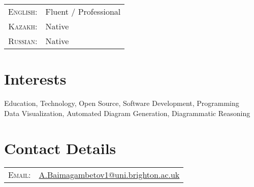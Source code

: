 \documentclass[a4paper,11pt]{article} %
\begin{document}
\begin{tabular}{rl}
\textsc{English:} & Fluent / Professional\\

\textsc{Kazakh:} & Native\\

\textsc{Russian:} & Native\\
\end{tabular}
\bigskip




\section{Interests}

Education, Technology, Open Source, Software Development, Programming\\
Data Visualization, Automated Diagram Generation, Diagrammatic Reasoning\\
\bigskip



\section{Contact Details}

\begin{tabular}{rl}
\textsc{Email:}   & \href{mailto:A.Baimagambetov1@uni.brighton.ac.uk}{A.Baimagambetov1@uni.brighton.ac.uk}
\end{tabular}
\end{document}
